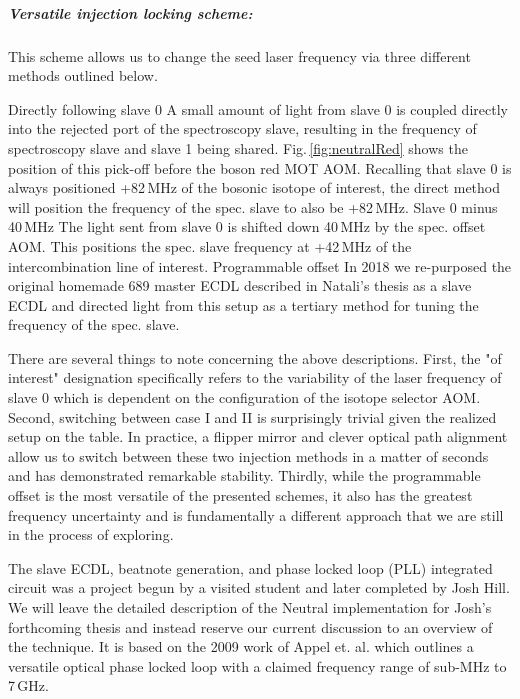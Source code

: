 \subparagraph{Versatile injection locking scheme:}
This scheme allows us to change the seed laser frequency via three different methods outlined below.
\begin{outline}[enumerate]
	\1 Directly following slave 0
		\2 A small amount of light from slave 0 is coupled directly into the rejected port of the spectroscopy slave, resulting in the frequency of spectroscopy slave and slave 1 being shared. 
		Fig.\,\ref{fig:neutralRed} shows the position of this pick-off before the boson red MOT AOM. 
		Recalling that slave 0 is always positioned +82\,MHz of the bosonic isotope of interest, the direct method will position the frequency of the spec. slave to also be +82\,MHz.
	\1 Slave 0 minus 40\,MHz
		\2 The light sent from slave 0 is shifted down 40\,MHz by the spec. offset AOM. This positions the spec. slave frequency at +42\,MHz of the intercombination line of interest.
	\1 Programmable offset
		\2 In 2018 we re-purposed the original homemade 689 master ECDL described in Natali's thesis as a slave ECDL and directed light from this setup as a tertiary method for tuning the frequency of the spec. slave. 
\end{outline}
There are several things to note concerning the above descriptions.
First, the "of interest" designation specifically refers to the variability of the laser frequency of slave 0 which is dependent on the configuration of the isotope selector AOM.
Second, switching between case I and II is surprisingly trivial given the realized setup on the table.
In practice, a flipper mirror and clever optical path alignment allow us to switch between these two injection methods in a matter of seconds and has demonstrated remarkable stability.
Thirdly, while the programmable offset is the most versatile of the presented schemes, it also has the greatest frequency uncertainty and is fundamentally a different approach that we are still in the process of exploring.

The slave ECDL, beatnote generation, and phase locked loop (PLL) integrated circuit was a project begun by a visited student and later completed by Josh Hill.
We will leave the detailed description of the Neutral implementation for Josh's forthcoming thesis and instead reserve our current discussion to an overview of the technique.
It is based on the 2009 work of Appel et. al. \cite{zfr08expansion} which outlines a versatile optical phase locked loop with a claimed frequency range of sub-MHz to 7\,GHz.

